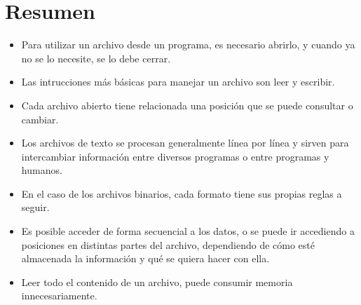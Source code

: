 \section{Resumen}

\begin{itemize}
\item Para utilizar un archivo desde un programa, es necesario abrirlo, y
cuando ya no se lo necesite, se lo debe cerrar.
\item Las intrucciones más básicas para manejar un archivo son leer y escribir. 
\item Cada archivo abierto tiene relacionada una posición que se puede
consultar o cambiar. 
\item Los archivos de texto se procesan generalmente línea por línea y
sirven para intercambiar información entre diversos programas o entre
programas y humanos.
\item En el caso de los archivos binarios, cada formato tiene sus propias
reglas a seguir.
\item Es posible acceder de forma secuencial a los datos, o se puede ir
accediendo a posiciones en distintas partes del archivo, dependiendo de
cómo esté almacenada la información y qué se quiera hacer con ella.
\item Leer todo el contenido de un archivo, puede consumir memoria
innecesariamente.
\end{itemize}


